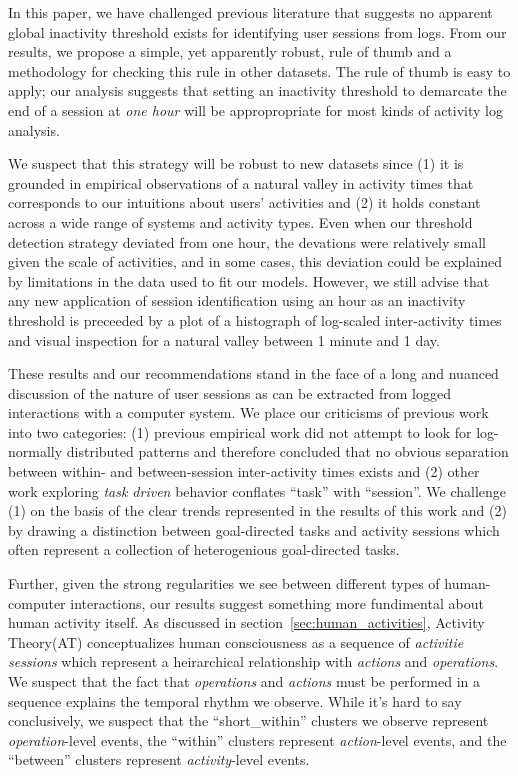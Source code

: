 In this paper, we have challenged previous literature that suggests no apparent global inactivity threshold exists for identifying user sessions from logs.  From our results, we propose a simple, yet apparently robust, rule of thumb and a methodology for checking this rule in other datasets.  The rule of thumb is easy to apply; our analysis suggests that setting an inactivity threshold to demarcate the end of a session at \emph{one hour} will be appropropriate for most kinds of activity log analysis.

We suspect that this strategy will be robust to new datasets since (1) it is grounded in empirical observations of a natural valley in activity times that corresponds to our intuitions about users' activities and (2) it holds constant across a wide range of systems and activity types. Even when our threshold detection strategy deviated from one hour, the devations were relatively small given the scale of activities, and in some cases, this deviation could be explained by limitations in the data used to fit our models.  However, we still advise that any new application of session identification using an hour as an inactivity threshold is preceeded by a plot of a histograph of log-scaled inter-activity times and visual inspection for a natural valley between 1 minute and 1 day.

These results and our recommendations stand in the face of a long and nuanced discussion of the nature of user sessions as can be extracted from logged interactions with a computer system.  We place our criticisms of previous work into two categories: (1) previous empirical work did not attempt to look for log-normally distributed patterns and therefore concluded that no obvious separation between within- and between-session inter-activity times exists\cite{mehrzadi2012onextracting}\cite{catledge1995characterizing} and (2) other work exploring \emph{task driven} behavior conflates ``task'' with ``session''.  We challenge (1) on the basis of the clear trends represented in the results of this work and (2) by drawing a distinction between goal-directed tasks and activity sessions which often represent a collection of heterogenious goal-directed tasks.

Further, given the strong regularities we see between different types of human-computer interactions, our results suggest something more fundimental about human activity itself.  As discussed in section~\ref{sec:human_activities}, Activity Theory(AT) conceptualizes human consciousness as a sequence of \emph{activitie sessions} which represent a heirarchical relationship with \emph{actions} and \emph{operations}.  We suspect that the fact that \emph{operations} and \emph{actions} must be performed in a sequence explains the temporal rhythm we observe.  While it's hard to say conclusively, we suspect that the ``short\_within'' clusters we observe represent \emph{operation}-level events, the ``within'' clusters represent \emph{action}-level events, and the ``between'' clusters represent \emph{activity}-level events.

